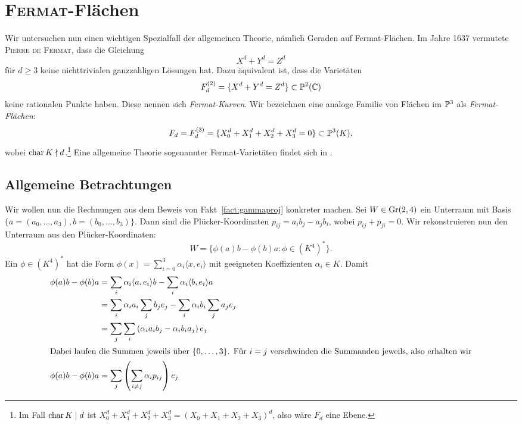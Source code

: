 \chapter{\textsc{Fermat}-Flächen} \label{chap:fermat}
Wir untersuchen nun einen wichtigen Spezialfall der allgemeinen Theorie, nämlich Geraden auf Fermat-Flächen. Im Jahre 1637 vermutete \textsc{Pierre de Fermat}, dass die Gleichung
\begin{equation*}
X^d + Y^d = Z^d
\end{equation*}
für $d \geq 3$ keine nichttrivialen ganzzahligen Lösungen hat. Dazu äquivalent ist, dass die Varietäten
\begin{equation*}
F_d^{(2)} = \{ X^d + Y^d = Z^d \} \subset \mathbb P^{2}(\mathbb C)
\end{equation*}
keine rationalen Punkte haben. Diese nennen sich \emph{Fermat-Kurven}. Wir bezeichnen eine analoge Familie von Flächen im $\mathbb P^{3}$ als \emph{Fermat-Flächen}:
\begin{equation}
F_d = F_d^{(3)} = \{ X_0^d + X_1^d + X_2^d + X_3^d = 0 \} \subset \mathbb P^{3}(K),
\end{equation}
wobei $\operatorname{char} K \nmid d$.\footnote{Im Fall $\operatorname{char} K \mid d$ ist $X_0^d + X_1^d + X_2^d + X_3^d = (X_0 + X_1 + X_2 + X_3)^d$, also wäre $F_d$ eine Ebene.} Eine allgemeine Theorie sogenannter Fermat-Varietäten findet sich in \cite{Fermat}.

\section{Allgemeine Betrachtungen}
Wir wollen nun die Rechnungen aus dem Beweis von Fakt~\ref{fact:gammaproj} konkreter machen. Sei $W \in \grass 2/4$ ein Unterraum mit Basis $\{a = (a_0, \dots, a_3), b = (b_0, \dots, b_3)\}$. Dann sind die Plücker-Koordinaten $p_{ij} = a_i b_j - a_j b_i$, wobei $p_{ij} + p_{ji} = 0$. Wir rekonstruieren nun den Unterraum aus den Plücker-Koordinaten:
\begin{equation}
W = \{ \phi(a)b - \phi(b)a \colon \phi \in (K^4)^* \}.
\end{equation}
Ein $\phi \in (K^4)^*$ hat die Form $\phi(x) = \sum_{i=0}^3 \alpha_i \langle x, e_i \rangle$ mit geeigneten Koeffizienten $\alpha_i \in K$. Damit
\begin{align*}
\phi(a)b - \phi(b)a &= \sum_i \alpha_i \langle a, e_i \rangle b - \sum_i \alpha_i \langle b, e_i \rangle a \\
	&= \sum_i \alpha_i a_i \sum_j b_j e_j - \sum_i \alpha_i b_i \sum_j a_j e_j \\
	&= \sum_j \sum_i \left(\alpha_i a_i b_j - \alpha_i b_i a_j \right) e_j \\
\intertext{Dabei laufen die Summen jeweils über $\{0,\dots,3\}$. Für $i=j$ verschwinden die Summanden jeweils, also erhalten wir}
\phi(a)b - \phi(b)a &= \sum_j \left(\sum_{i \neq j} \alpha_i p_{ij} \right) e_j
\end{align*}

